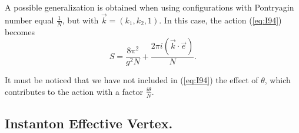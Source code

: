 A possible generalization is obtained when using configurations
with Pontryagin number equal $\frac {1}{N}$, but with
$\vec{k}=(k_1,k_2,1)$. In this case, the action (\ref{eq:I94}) becomes 
\begin{equation}
S = \frac {8 \pi^2}{g^2 N} + \frac {2 \pi i (\vec{k} \cdot \vec{e})}{N}.
\label{eq:I95}
\end{equation}
  
It must be noticed that we have not included in (\ref{eq:I94})
the effect of $\theta$, which contributes to the action with a
factor $\frac {i \theta}{N}$.


\subsection{Instanton Effective Vertex.}
\label{sec:ins}

